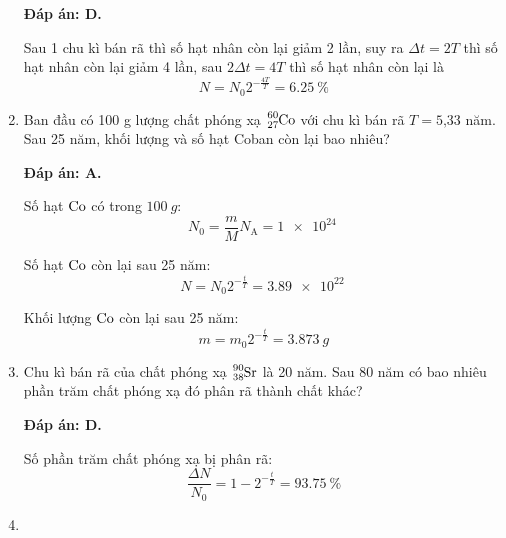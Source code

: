 \begin{enumerate}[label=\bfseries Câu \arabic*:]
	\loigiai
	{		\textbf{Đáp án: D.}
		
		Sau 1 chu kì bán rã thì số hạt nhân còn lại giảm 2 lần, suy ra $\Delta t = 2T$ thì số hạt nhân còn lại giảm 4 lần, sau $2\Delta t = 4T$ thì số hạt nhân còn lại là
		$$N=N_0 2^{-\frac{4T}{T}} = \SI{6.25}{\percent}$$
		
	}
	\item {}
	
	\cauhoi
	{Ban đầu có 100 g lượng chất phóng xạ $\ce{^{60}_{27} Co}$ với chu kì bán rã $T=\text{5,33}$ năm. Sau 25 năm, khối lượng và số hạt Coban còn lại bao nhiêu?
	}
	
	\loigiai
	{		\textbf{Đáp án: A.}
		
		Số hạt $\ce{Co}$ có trong $\SI{100}{g}$:
		$$N_0 = \dfrac{m}{M} N_\text{A} = \SI{1e24}{}$$
		
		Số hạt $\ce{Co}$ còn lại sau 25 năm:
		$$N=N_0 2^{-\frac{t}{T}} = \SI{3.89e22}{}$$
		
		Khối lượng $\ce{Co}$ còn lại sau 25 năm:
		$$m=m_0 2^{-\frac{t}{T}} = \SI{3,873}{g}$$
		
	}\item {}

\cauhoi
{Chu kì bán rã của chất phóng xạ $\ce{^{90}_{38} Sr}$ là 20 năm. Sau 80 năm có bao nhiêu phần trăm chất phóng xạ đó phân rã thành chất khác?
}

\loigiai
{		\textbf{Đáp án: D.}

Số phần trăm chất phóng xạ bị phân rã:
$$\dfrac{\Delta N}{N_0} = 1-2^{-\frac{t}{T}} = \SI{93.75}{\percent}$$

}

\item {}


\end{enumerate}
